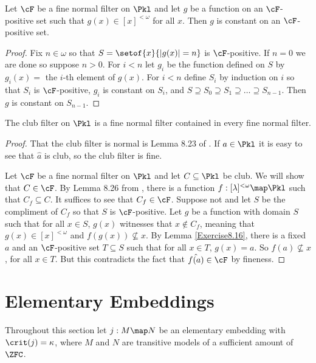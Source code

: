 \documentclass[oneside,12pt]{amsart}
\begin{document}
\begin{lemma}
\label{Exercise8.16}
Let $\cF$ be a fine normal filter on $\Pkl$ and let $g$ be a function on an $\cF$-positive set
such that $g(x)\in[x]^{<\omega}$ for all $x$. Then $g$ is constant on an $\cF$-positive set.
\end{lemma}
\begin{proof}
Fix $n\in\omega$ so that $S = \setof{x}{|g(x)|=n}$ is $\cF$-positive. If $n=0$ we are done so suppose $n>0$.
For $i<n$ let $g_i$ be the function defined on $S$ by
$g_i(x) = $ the $i$-th element of $g(x)$.
For $i<n$ define $S_i$ by induction on $i$ so that $S_i$ is $\cF$-positive, $g_i$ is constant on $S_i$,
and $S\supseteq S_0\supseteq S_1 \supseteq \dots \supseteq S_{n-1}$. Then $g$ is constant on $S_{n-1}$.
\end{proof}

\begin{lemma}
The club filter on $\Pkl$ is a fine normal filter contained in every fine normal filter.
\end{lemma}
\begin{proof}
That the club filter is normal is Lemma 8.23 of \cite{Jech_Book2}.
If $a\in\Pkl$ it is easy to see that $\hat{a}$ is club, so the club filter is fine.

Let $\cF$ be a fine normal filter on $\Pkl$ and let $C\subseteq\Pkl$ be club.
We will show that $C\in\cF$. By Lemma 8.26 from \cite{Jech_Book2}, there is a function
$f:[\lambda]^{<\omega}\map\Pkl$ such that $C_f\subseteq C$. It suffices to see that
$C_f\in\cF$. Suppose not and let $S$ be the compliment of $C_f$ so that $S$ is $\cF$-positive.
Let $g$ be a function with domain $S$ such that for all $x\in S$, $g(x)$ witnesses that
$x\notin C_f$, meaning that $g(x)\in [x]^{<\omega}$ and $f(g(x))\not\subseteq x$.
By Lemma \ref{Exercise8.16}, there is a fixed $a$ and an $\cF$-positive set $T\subseteq S$
such that for all $x\in T$, $g(x)=a$. So $f(a)\not\subseteq x$, for all $x\in T$. But this
contradicts the fact that $\hat{f(a)}\in\cF$ by fineness.
\end{proof}


\section{Elementary Embeddings}

Throughout this section let $j:M \map N$ be an elementary embedding with $\crit(j)=\kappa$, where $M$ and $N$ are
transitive models of a sufficient amount of $\ZFC$.
\end{document}
